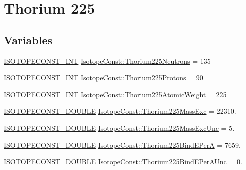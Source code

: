 \hypertarget{group___isotope_const-_thorium-_th225}{}\section{Thorium 225}
\label{group___isotope_const-_thorium-_th225}
\subsection*{Variables}
\begin{DoxyCompactItemize}
\item 
\mbox{\hyperlink{group___isotope_const-_macros_ga5f18360b3e99483a35c32d789e62621c}{I\+S\+O\+T\+O\+P\+E\+C\+O\+N\+S\+T\+\_\+\+I\+NT}} \mbox{\hyperlink{group___isotope_const-_thorium-_th225_ga93bf586f8a59054fb4d671cb59f64573}{Isotope\+Const\+::\+Thorium225\+Neutrons}} = 135
\item 
\mbox{\hyperlink{group___isotope_const-_macros_ga5f18360b3e99483a35c32d789e62621c}{I\+S\+O\+T\+O\+P\+E\+C\+O\+N\+S\+T\+\_\+\+I\+NT}} \mbox{\hyperlink{group___isotope_const-_thorium-_th225_ga5f6ac73542ca850ca0134c63b753270c}{Isotope\+Const\+::\+Thorium225\+Protons}} = 90
\item 
\mbox{\hyperlink{group___isotope_const-_macros_ga5f18360b3e99483a35c32d789e62621c}{I\+S\+O\+T\+O\+P\+E\+C\+O\+N\+S\+T\+\_\+\+I\+NT}} \mbox{\hyperlink{group___isotope_const-_thorium-_th225_ga41173789d08d825834c8547ef202a9fe}{Isotope\+Const\+::\+Thorium225\+Atomic\+Weight}} = 225
\item 
\mbox{\hyperlink{group___isotope_const-_macros_ga8f45a7272ce02c0b4c65c44636ed719a}{I\+S\+O\+T\+O\+P\+E\+C\+O\+N\+S\+T\+\_\+\+D\+O\+U\+B\+LE}} \mbox{\hyperlink{group___isotope_const-_thorium-_th225_ga206369ba8be8cb3f99ea5315c3b7f6e8}{Isotope\+Const\+::\+Thorium225\+Mass\+Exc}} = 22310.
\item 
\mbox{\hyperlink{group___isotope_const-_macros_ga8f45a7272ce02c0b4c65c44636ed719a}{I\+S\+O\+T\+O\+P\+E\+C\+O\+N\+S\+T\+\_\+\+D\+O\+U\+B\+LE}} \mbox{\hyperlink{group___isotope_const-_thorium-_th225_gae7c3c23cf8c676f0d70e8284600576dc}{Isotope\+Const\+::\+Thorium225\+Mass\+Exc\+Unc}} = 5.
\item 
\mbox{\hyperlink{group___isotope_const-_macros_ga8f45a7272ce02c0b4c65c44636ed719a}{I\+S\+O\+T\+O\+P\+E\+C\+O\+N\+S\+T\+\_\+\+D\+O\+U\+B\+LE}} \mbox{\hyperlink{group___isotope_const-_thorium-_th225_ga27fb760bdf43dc6f92a0201500bf81a3}{Isotope\+Const\+::\+Thorium225\+Bind\+E\+PerA}} = 7659.
\item 
\mbox{\hyperlink{group___isotope_const-_macros_ga8f45a7272ce02c0b4c65c44636ed719a}{I\+S\+O\+T\+O\+P\+E\+C\+O\+N\+S\+T\+\_\+\+D\+O\+U\+B\+LE}} \mbox{\hyperlink{group___isotope_const-_thorium-_th225_gaf5cf1664ce74df816b3dc00aa6d0e84e}{Isotope\+Const\+::\+Thorium225\+Bind\+E\+Per\+A\+Unc}} = 0.

\end{DoxyCompactItemize}
